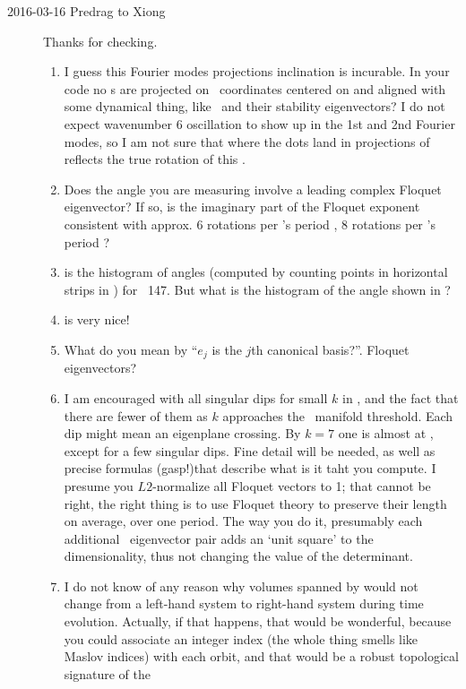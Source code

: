 \begin{description}
\item[2016-03-16 Predrag to Xiong]
Thanks for checking.
\begin{enumerate}
  \item
I guess this Fourier modes projections inclination is incurable. In your
code no \rpo s are projected on \statesp\ coordinates centered on and
aligned with some dynamical thing, like \reqva\ and their stability
eigenvectors? I do not expect wavenumber 6 oscillation to show up in the
1st and 2nd Fourier modes, so I am not sure that where the dots
land in projections of  reflects the true rotation
of this \ppo.
  \item
Does the angle you are measuring involve a leading complex Floquet
eigenvector? If so, is the imaginary part of the Floquet exponent
consistent with approx.
6 rotations per \ppo's period ,
8 rotations per \ppo's period ?
  \item
{} is the histogram of angles (computed by
counting points in horizontal strips in  ) for
\ppo\ 147. But what is the histogram of the angle shown in
?
  \item {} is very nice!
  \item
What do you mean by ``$e_j$ is the $j$th canonical basis?''. Floquet
eigenvectors?
  \item
I am encouraged with all singular dips for small $k$ in
, and the fact that there are fewer of them as $k$
approaches the \entangled\ manifold threshold. Each dip might mean an
eigenplane crossing. By $k=7$ one is almost at ,
except for a few singular dips.
Fine detail will be needed, as well as precise formulas (gasp!)that
describe what is it taht you compute.
I presume you $L2$-normalize all Floquet vectors to 1; that cannot be
right, the right thing is to use Floquet theory to preserve their length
on average, over one period. The way you do it, presumably each
additional \transient\ eigenvector pair adds an `unit square' to the
dimensionality, thus not changing the value of the determinant.
  \item
I do not know of any reason why volumes spanned by would not change from
a left-hand system to right-hand system during time evolution. Actually,
if that happens, that would be wonderful, because you could associate an
integer index (the whole thing smells like Maslov indices) with each
orbit, and that would be a robust topological signature of the

\end{enumerate}
\end{description}
